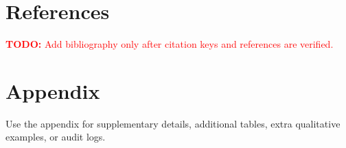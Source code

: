 \documentclass[11pt]{article}
\newcommand{\todo}[1]{\textcolor{red}{\textbf{TODO:} #1}}
\begin{document}
\section{References}

%
% 
% 

\todo{Add bibliography only after citation keys and references are verified.}

\appendix

\section{Appendix}

Use the appendix for supplementary details, additional tables, extra qualitative examples, or audit logs.
\end{document}
